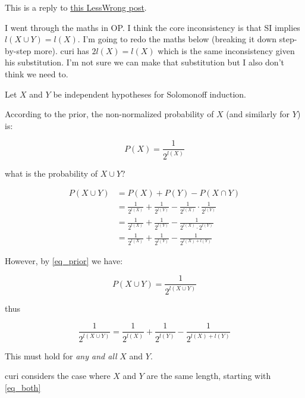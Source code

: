\documentclass{article}
\begin{document}
This is a reply to \href{https://www.lesswrong.com/posts/hD4boFF6K782grtqX/mathematical-inconsistency-in-solomonoff-induction}{this LessWrong post}.

I went through the maths in OP. I think the core inconsistency is that SI implies \(l(X \cup Y) = l(X)\). I'm going to redo the maths below (breaking it down step-by-step more). curi has \(2l(X) = l(X)\) which is the same inconsistency given his substitution. I'm not sure we can make that substitution but I also don't think we need to.

Let $X$ and $Y$ be independent hypotheses for Solomonoff induction.

According to the prior, the non-normalized probability of $X$ (and similarly for $Y$) is:


\begin{equation} \label{eq_prior}
P(X) = \frac{1}{2^{l(X)}}
\end{equation}

what is the probability of \(X\cup Y\)?

\begin{equation} \label{eq_std_prob}
\begin{split}
P(X\cup Y) & = P(X) + P(Y) - P(X\cap Y) \\
& = \frac{1}{2^{l(X)}} + \frac{1}{2^{l(Y)}} - \frac{1}{2^{l(X)}} \cdot \frac{1}{2^{l(Y)}} \\
& = \frac{1}{2^{l(X)}} + \frac{1}{2^{l(Y)}} - \frac{1}{2^{l(X)} \cdot 2^{l(Y)}} \\
& = \frac{1}{2^{l(X)}} + \frac{1}{2^{l(Y)}} - \frac{1}{2^{l(X) + l(Y)}}
\end{split}
\end{equation}

However, by \cref{eq_prior} we have:

\begin{equation} \label{eq_or}
P(X\cup Y) = \frac{1}{2^{l(X\cup Y)}}
\end{equation}

thus

\begin{equation} \label{eq_both}
\frac{1}{2^{l(X\cup Y)}} = \frac{1}{2^{l(X)}} + \frac{1}{2^{l(Y)}} - \frac{1}{2^{l(X) + l(Y)}}
\end{equation}

This must hold for \emph{any and all} $X$ and $Y$.

curi considers the case where $X$ and $Y$ are the same length, starting with \cref{eq_both}
\end{document}
